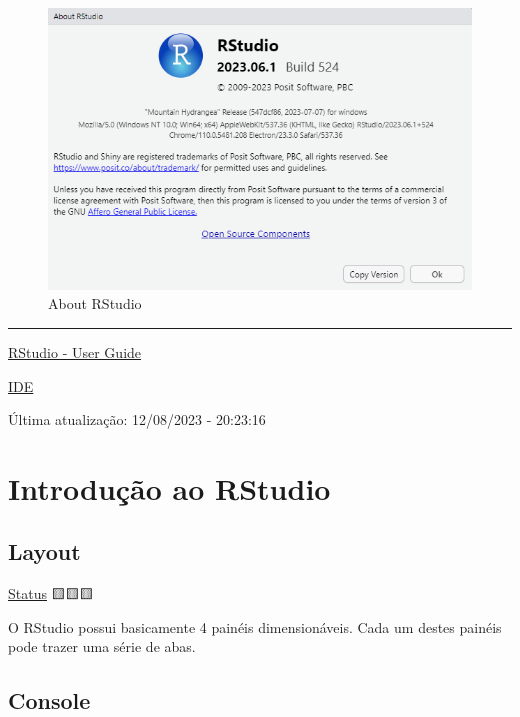 \documentclass[
  letterpaper,
  DIV=11,
  numbers=noendperiod]{scrreprt}
\begin{document}
\begin{figure}

{\centering \includegraphics{./images/rstudio/about_rstudio.png}

}

\caption{\label{fig-rstudio-about}About RStudio}

\end{figure}

\begin{center}\rule{0.5\linewidth}{0.5pt}\end{center}

\href{https://docs.posit.co/ide/user/}{RStudio - User Guide}

\href{https://en.wikipedia.org/wiki/Integrated_development_environment}{IDE}

Última atualização: 12/08/2023 - 20:23:16

\hypertarget{introduuxe7uxe3o-ao-rstudio}{%
\chapter{Introdução ao RStudio}\label{introduuxe7uxe3o-ao-rstudio}}

\hypertarget{layout}{%
\section{Layout}\label{layout}}

\protect\hyperlink{status-do-material}{Status} 🟨🟨🟨

O RStudio possui basicamente 4 painéis dimensionáveis. Cada um destes
painéis pode trazer uma série de abas.

\hypertarget{console}{%
\section{Console}\label{console}}
\end{document}
